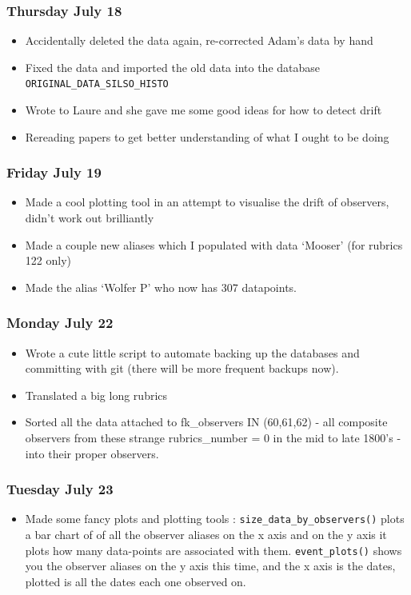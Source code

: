 \documentclass[12pt]{article}
\begin{document}
\subsubsection{Thursday July 18}
\begin{itemize}
    \item Accidentally deleted the data again, re-corrected Adam's data by hand
    \item Fixed the data and imported the old data into the database \texttt{ORIGINAL\_DATA\_SILSO\_HISTO}
    \item Wrote to Laure and she gave me some good ideas for how to detect drift
    \item Rereading papers to get better understanding of what I ought to be doing
\end{itemize}

\subsubsection{Friday July 19}
\begin{itemize}
    \item Made a cool plotting tool in an attempt to visualise the drift of observers, didn't work out brilliantly
    \item Made a couple new aliases which I populated with data `Mooser' (for rubrics 122 only)
    \item Made the alias `Wolfer P' who now has 307 datapoints.
\end{itemize}

\subsubsection{Monday July 22}
\begin{itemize}
    \item Wrote a cute little script to automate backing up the databases and committing with git (there will be more frequent backups now).
    \item Translated a big long rubrics
    \item Sorted all the data attached to fk\_observers IN (60,61,62) - all composite observers from these strange rubrics\_number = 0 in the mid to late 1800's - into their proper observers.
\end{itemize}

\subsubsection{Tuesday July 23}
\begin{itemize}
    \item Made some fancy plots and plotting tools : \texttt{size\_data\_by\_observers()} plots a bar chart of of all the observer aliases on the x axis and on the y axis it plots how many data-points are associated with them. \texttt{event\_plots()} shows you the observer aliases on the y axis this time, and the x axis is the dates, plotted is all the dates each one observed on.
\end{itemize}
\end{document}
